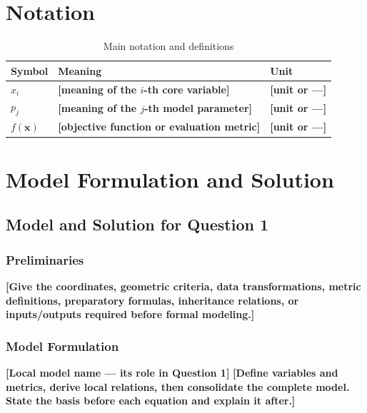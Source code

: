 \documentclass[12pt,letterpaper]{article}
\newcommand{\TemplateField}[1]{\textbf{[#1]}}
\begin{document}
\section{Notation}
\begin{table}[htbp]
  \centering
  \caption{Main notation and definitions}
  \label{tab:symbols}
  \begin{tabularx}{0.88\textwidth}{>{\centering\arraybackslash}p{}X>{\centering\arraybackslash}p{}}
    \toprule[1.2pt]
    Symbol & Meaning & Unit \\
    \midrule[0.8pt]
    $x_i$ & \TemplateField{meaning of the $i$-th core variable} & \TemplateField{unit or ---} \\
    $p_j$ & \TemplateField{meaning of the $j$-th model parameter} & \TemplateField{unit or ---} \\
    $f(\symbf{x})$ & \TemplateField{objective function or evaluation metric} & \TemplateField{unit or ---} \\
    \bottomrule[1.2pt]
  \end{tabularx}
\end{table}

\section{Model Formulation and Solution}

\subsection{Model and Solution for Question 1}

\subsubsection{Preliminaries}
\TemplateField{Give the coordinates, geometric criteria, data transformations, metric definitions, preparatory formulas, inheritance relations, or inputs/outputs required before formal modeling.}

\subsubsection{Model Formulation}
\noindent\TemplateField{Local model name --- its role in Question 1}
\TemplateField{Define variables and metrics, derive local relations, then consolidate the complete model. State the basis before each equation and explain it after.}
\end{document}
